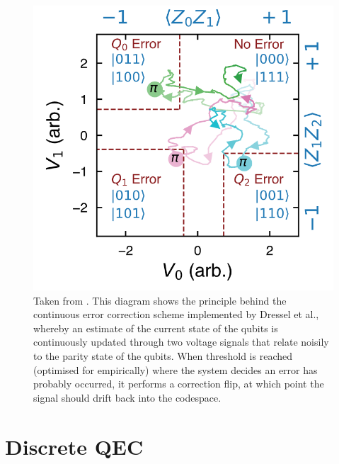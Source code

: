 \documentclass{report}
\begin{document}
\begin{figure}[ht]
    \centering
    \includegraphics[scale = 0.3]{Figures/dresseldiagram.png}
    \caption{Taken from \cite{Dressel2022}. This diagram shows the principle behind the continuous error correction scheme implemented by Dressel et al., whereby an estimate of the current state of the qubits is continuously updated through two voltage signals that relate noisily to the parity state of the qubits. When threshold is reached (optimised for empirically) where the system decides an error has probably occurred, it performs a correction flip, at which point the signal should drift back into the codespace.}
    \label{fig:dresseldiagram}
\end{figure}


\chapter{Discrete QEC}\label{chapter:DQEC}
\end{document}
